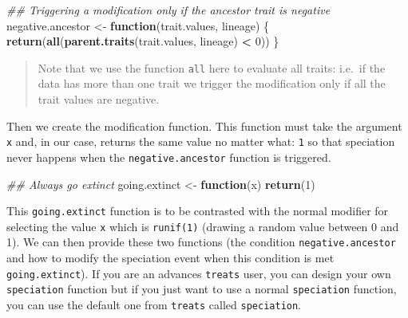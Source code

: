 \documentclass[
]{book}
\newenvironment{Shaded}{\begin{snugshade}}{\end{snugshade}}
\newcommand{\CommentTok}[1]{\textcolor[rgb]{0.56,0.35,0.01}{\textit{#1}}}
\newcommand{\ControlFlowTok}[1]{\textcolor[rgb]{0.13,0.29,0.53}{\textbf{#1}}}
\newcommand{\DecValTok}[1]{\textcolor[rgb]{0.00,0.00,0.81}{#1}}
\newcommand{\KeywordTok}[1]{\textcolor[rgb]{0.13,0.29,0.53}{\textbf{#1}}}
\newcommand{\NormalTok}[1]{#1}
\newcommand{\OperatorTok}[1]{\textcolor[rgb]{0.81,0.36,0.00}{\textbf{#1}}}
\newcommand{\StringTok}[1]{\textcolor[rgb]{0.31,0.60,0.02}{#1}}
\begin{document}
\begin{Shaded}
\begin{Highlighting}[]
\CommentTok{\#\# Triggering a modification only if the ancestor trait is negative}
\NormalTok{negative.ancestor \textless{}{-}}\StringTok{ }\ControlFlowTok{function}\NormalTok{(trait.values, lineage) \{}
    \KeywordTok{return}\NormalTok{(}\KeywordTok{all}\NormalTok{(}\KeywordTok{parent.traits}\NormalTok{(trait.values, lineage) }\OperatorTok{\textless{}}\StringTok{ }\DecValTok{0}\NormalTok{))}
\NormalTok{\}}
\end{Highlighting}
\end{Shaded}

\begin{quote}
Note that we use the function \texttt{all} here to evaluate all traits: i.e.~if the data has more than one trait we trigger the modification only if all the trait values are negative.
\end{quote}

Then we create the modification function.
This function must take the argument \texttt{x} and, in our case, returns the same value no matter what: \texttt{1} so that speciation never happens when the \texttt{negative.ancestor} function is triggered.

\begin{Shaded}
\begin{Highlighting}[]
\CommentTok{\#\# Always go extinct}
\NormalTok{going.extinct \textless{}{-}}\StringTok{ }\ControlFlowTok{function}\NormalTok{(x) }\KeywordTok{return}\NormalTok{(}\DecValTok{1}\NormalTok{)}
\end{Highlighting}
\end{Shaded}

This \texttt{going.extinct} function is to be contrasted with the normal modifier for selecting the value \texttt{x} which is \texttt{runif(1)} (drawing a random value between 0 and 1).
We can then provide these two functions (the condition \texttt{negative.ancestor} and how to modify the speciation event when this condition is met \texttt{going.extinct}).
If you are an advances \texttt{treats} user, you can design your own \texttt{speciation} function but if you just want to use a normal \texttt{speciation} function, you can use the default one from \texttt{treats} called \texttt{speciation}.
\end{document}
